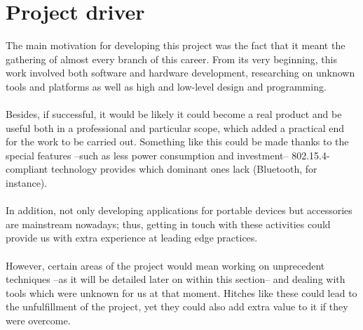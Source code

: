 	\section{Project driver}
		The main motivation for developing this project was the fact that it meant
		the gathering of almost every branch of this career. From its very beginning, this
		work involved both software and hardware development, researching on unknown 
		tools and platforms as well as high and low-level design and programming.\\\\
		Besides, if successful, it would be likely it could become a real product
		and be useful both in a professional and particular scope, which added a practical
		end for the work to be carried out. Something like this could be made thanks to
		the special features --such as less power consumption and investment-- 802.15.4-compliant
		technology provides which dominant ones lack (Bluetooth, for instance).\\\\
		In addition, not only developing applications for portable devices but accessories
		are mainstream nowadays; thus, getting in touch with these activities could
		provide us with extra experience at leading edge practices.\\\\
		However, certain areas of the project would mean working on unprecedent techniques
		--as it will be detailed later on within this section-- and dealing with tools
		which were unknown for us at that moment. Hitches like these could lead to the
		unfulfillment of the project, yet they could also add extra value to it if 
		they were overcome.\\
		
